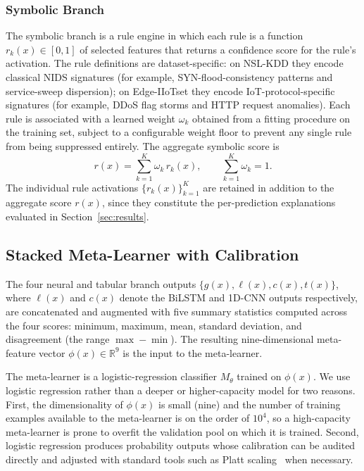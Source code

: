 \documentclass[pdflatex,sn-mathphys-num]{sn-jnl}
\theoremstyle{thmstyleone}
\theoremstyle{thmstyletwo}
\theoremstyle{thmstylethree}
\begin{document}
\subsubsection{Symbolic Branch}
The symbolic branch is a rule engine in which each rule is a function $r_k(x) \in [0,1]$ of selected features that returns a confidence score for the rule's activation. The rule definitions are dataset-specific: on NSL-KDD they encode classical NIDS signatures (for example, SYN-flood-consistency patterns and service-sweep dispersion); on Edge-IIoTset they encode IoT-protocol-specific signatures (for example, DDoS flag storms and HTTP request anomalies). Each rule is associated with a learned weight $\omega_k$ obtained from a fitting procedure on the training set, subject to a configurable weight floor to prevent any single rule from being suppressed entirely. The aggregate symbolic score is
\begin{equation}
\label{eq:sym-aggregate}
r(x) = \sum_{k=1}^{K} \omega_k \, r_k(x), \qquad \sum_{k=1}^{K} \omega_k = 1.
\end{equation}
The individual rule activations $\{r_k(x)\}_{k=1}^{K}$ are retained in addition to the aggregate score $r(x)$, since they constitute the per-prediction explanations evaluated in Section~\ref{sec:results}.

\subsection{Stacked Meta-Learner with Calibration}\label{sec:method-meta}

The four neural and tabular branch outputs $\{g(x), \ell(x), c(x), t(x)\}$, where $\ell(x)$ and $c(x)$ denote the BiLSTM and 1D-CNN outputs respectively, are concatenated and augmented with five summary statistics computed across the four scores: minimum, maximum, mean, standard deviation, and disagreement (the range $\max - \min$). The resulting nine-dimensional meta-feature vector $\phi(x) \in \mathbb{R}^{9}$ is the input to the meta-learner.

The meta-learner is a logistic-regression classifier $M_\theta$ trained on $\phi(x)$. We use logistic regression rather than a deeper or higher-capacity model for two reasons. First, the dimensionality of $\phi(x)$ is small (nine) and the number of training examples available to the meta-learner is on the order of $10^{4}$, so a high-capacity meta-learner is prone to overfit the validation pool on which it is trained. Second, logistic regression produces probability outputs whose calibration can be audited directly and adjusted with standard tools such as Platt scaling~\cite{platt1999probabilistic} when necessary.
\end{document}

